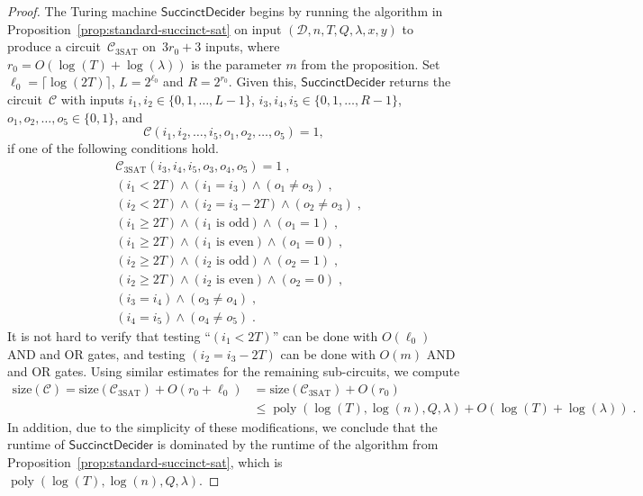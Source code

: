 \documentclass[11pt]{article}
\theoremstyle{definition}
\DeclareMathOperator{\poly}{poly}
\newcommand{\decider}{\mathcal{D}}
\newcommand{\succinctdecider}{\ensuremath{\mathsf{SuccinctDecider}}}
\newcommand{\circuit}{\mathcal{C}}
\newcommand{\qlen}{Q}
\begin{document}
\begin{proof}
  The Turing machine $\succinctdecider$ begins by running the algorithm in
  Proposition~\ref{prop:standard-succinct-sat} on input
  $(\decider,n,T,\qlen,\lambda, x,y)$ to produce a
  circuit~$\circuit_{\mathrm{3SAT}}$ on~$3r_0+3$ inputs, where $r_0 =
  O(\log(T)+\log(\lambda))$ is the parameter $m$ from the proposition.
  Set $\ell_0 = \lceil \log(2T) \rceil$, $L = 2^{\ell_0}$ and $R = 2^{r_0}$.
  Given this, $\succinctdecider$ returns the circuit~$\circuit$ with inputs
  $i_1, i_2 \in \{0, 1, \ldots, L-1\}$, $i_3, i_4, i_5 \in \{0, 1, \ldots,
  R-1\}$, $o_1, o_2, \ldots, o_5 \in \{0, 1\}$, and
  \[
    \circuit(i_1, i_2, \ldots, i_5, o_1, o_2, \ldots, o_5) = 1,
  \]
  if one of the following conditions hold.
  \begin{align*}
    & \circuit_{\mathrm{3SAT}}(i_3, i_4, i_5, o_3, o_4, o_5) = 1\;,\\
    & (i_1 < 2T) \land (i_1 = i_3) \land (o_1 \neq o_3)\;,\\
    & (i_2 < 2T)\land (i_2 = i_3 - 2T) \land (o_2 \neq o_3)\;,\\
    & (i_1 \geq 2T) \land (\text{$i_1$ is odd}) \land (o_1 = 1)\;,\\
    & (i_1 \geq 2T) \land (\text{$i_1$ is even}) \land (o_1 = 0)\;,\\
    & (i_2 \geq 2T) \land (\text{$i_2$ is odd}) \land (o_2 = 1)\;,\\
    & (i_2 \geq 2T) \land (\text{$i_2$ is even}) \land (o_2 = 0)\;,\\
    & (i_3 = i_4) \land (o_3 \neq o_4)\;,\\
    & (i_4 = i_5) \land (o_4 \neq o_5)\;.
  \end{align*}
  It is not hard to verify that testing ``$(i_1 < 2T)$'' can be done with
  $O(\ell_0)$ AND and OR gates, and testing $(i_2 = i_3 - 2T)$ can be done with
  $O(m)$ AND and OR gates.
  Using similar estimates for the remaining sub-circuits, we compute
  \begin{equation*}
    \begin{split}
      \mathrm{size}(\circuit) = \mathrm{size}(\circuit_{\mathrm{3SAT}}) +
      O(r_0 + \ell_0) & = \mathrm{size}(\circuit_{\mathrm{3SAT}}) + O(r_0) \\
      & \leq \poly(\log(T), \log(n), \qlen,\lambda) + O(\log(T) + \log(\lambda))\;.
    \end{split}
  \end{equation*}
  In addition, due to the simplicity of these modifications, we conclude that
  the runtime of $\succinctdecider$ is dominated by the runtime of the algorithm
  from Proposition~\ref{prop:standard-succinct-sat}, which is $\poly(\log(T),
  \log(n), \qlen,\lambda)$.


\end{proof}
\end{document}
